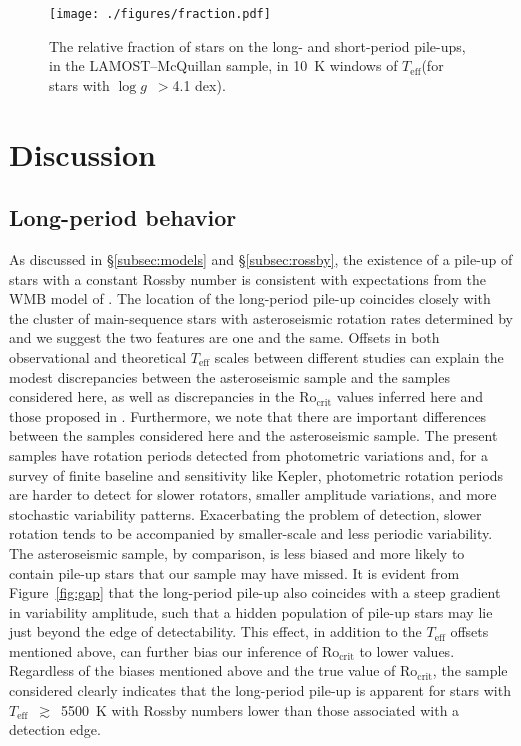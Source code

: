 \documentclass[linenumbers,tighten,trackchanges,twocolumn]{aastex631}
\newcommand{\rocrit}{$\mathrm{Ro_{crit}}$\xspace}
\newcommand{\lamostmcq}{LAMOST--McQuillan\xspace}
\newcommand{\teffmin}{5500~K\xspace}
\newcommand{\teff}{\ensuremath{T_{\mathrm{eff}}}\xspace}
\newcommand{\logg}{\ensuremath{\log g}\xspace}
\begin{document}
\begin{figure}
    \centering
    \texttt{[image: ./figures/fraction.pdf]}
    \caption{The relative fraction of stars on the long- and short-period pile-ups, in the \lamostmcq sample, in 10~K windows of \teff (for stars with \logg~$>$4.1 dex).}
    \label{fig:fraction}
\end{figure}


\section{Discussion} \label{sec:discussion}

\subsection{Long-period behavior} \label{subsec:longperiod}

As discussed in \S\ref{subsec:models} and \S\ref{subsec:rossby}, the existence of a pile-up of stars with a constant Rossby number is consistent with expectations from the WMB model of \citet{vanSaders2016, vanSaders2019}. The location of the long-period pile-up coincides closely with the cluster of main-sequence stars with asteroseismic rotation rates determined by \citet{Hall2021} and we suggest the two features are one and the same. Offsets in both observational and theoretical \teff scales between different studies can explain the modest discrepancies between the asteroseismic sample and the samples considered here, as well as discrepancies in the \rocrit values inferred here and those proposed in \citet{vanSaders2019}. {\color{red} Furthermore, we note that there are important differences between the samples considered here and the \citet{Hall2021} asteroseismic sample. The present samples have rotation periods detected from photometric variations and, for a survey of finite baseline and sensitivity like Kepler, photometric rotation periods are harder to detect for slower rotators, smaller amplitude variations, and more stochastic variability patterns. Exacerbating the problem of detection, slower rotation tends to be accompanied by smaller-scale and less periodic variability. The asteroseismic sample, by comparison, is less biased and more likely to contain pile-up stars that our sample may have missed. It is evident from Figure~\ref{fig:gap} that the long-period pile-up also coincides with a steep gradient in variability amplitude, such that a hidden population of pile-up stars may lie just beyond the edge of detectability. This effect, in addition to the \teff offsets mentioned above, can further bias our inference of \rocrit to lower values. Regardless of the biases mentioned above and the true value of \rocrit, the sample considered clearly indicates that the long-period pile-up is apparent for stars with \teff~$\gtrsim$~\teffmin with Rossby numbers lower than those associated with a detection edge.}
\end{document}
